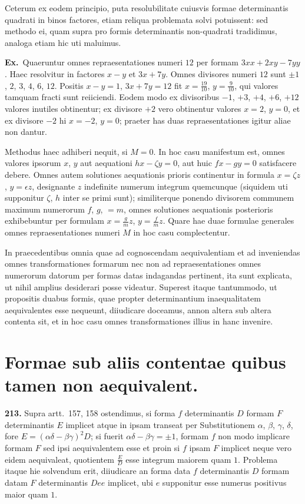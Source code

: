 \documentclass[12pt,a4paper]{article}
\theoremstyle{plain}
\theoremstyle{definition}
\theoremstyle{remark}
\begin{document}
Ceterum ex eodem principio, puta resolubilitate cuiusvis formae determinantis quadrati in binos factores, etiam reliqua problemata solvi potuissent: sed methodo ei, quam supra pro formis determinantis non-quadrati tradidimus, analoga etiam hic uti maluimus.

\textbf{Ex.}\ Quaeruntur omnes repraesentationes numeri $12$ per formam $3xx+2xy-7yy$. Haec resolvitur in factores $x-y$ et $3x+7y$. Omnes divisores numeri $12$ sunt $\pm 1$, $2$, $3$, $4$, $6$, $12$. Positis $x-y=1$, $3x+7y=12$ fit $x=\frac{19}{10}$, $y=\frac{9}{10}$, qui valores tamquam fracti sunt reiiciendi. Eodem modo ex divisoribus $-1$, $+3$, $+4$, $+6$, $+12$ valores inutiles obtinentur; ex divisore $+2$ vero obtinentur valores $x=2$, $y=0$, et ex divisore $-2$ hi $x=-2$, $y=0$; praeter has duas repraesentationes igitur aliae non dantur.

Methodus haec adhiberi nequit, si $M=0$. In hoc casu manifestum est, omnes valores ipsorum $x$, $y$ aut aequationi $hx-\zeta y=0$, aut huic $fx-gy=0$ satisfacere debere. Omnes autem solutiones aequationis prioris continentur in formula $x=\zeta z$, $y=\epsilon z$, designante $z$ indefinite numerum integrum quemcunque (siquidem uti supponitur $\zeta$, $h$ inter se primi sunt); similiterque ponendo divisorem communem maximum numerorum $f$, $g$, $=m$, omnes solutiones aequationis posterioris exhibebuntur per formulam $x=\frac{g}{m}z$, $y=\frac{f}{m}z$. Quare hae duae formulae generales omnes repraesentationes numeri $M$ in hoc casu complectentur.

In praecedentibus omnia quae ad cognoscendam aequivalentiam et ad inveniendas omnes transformationes formarum nec non ad repraesentationes omnes numerorum datorum per formas datas indagandas pertinent, ita sunt explicata, ut nihil amplius desiderari posse videatur. Superest itaque tantummodo, ut propositis duabus formis, quae propter determinantium inaequalitatem aequivalentes esse nequeunt, diiudicare doceamus, annon altera sub altera contenta sit, et in hoc casu omnes transformationes illius in hanc invenire.


\section*{Formae sub aliis contentae quibus tamen non aequivalent.}

\textbf{213.}
Supra artt.\ 157, 158 ostendimus, si forma $f$ determinantis $D$ formam $F$ determinantis $E$ implicet atque in ipsam transeat per Substitutionem $\alpha$, $\beta$, $\gamma$, $\delta$, fore $E=(\alpha\delta-\beta\gamma)^2D$; si fuerit $\alpha\delta-\beta\gamma=\pm 1$, formam $f$ non modo implicare formam $F$ sed ipsi aequivalentem esse et proin si $f$ ipsam $F$ implicet neque vero eidem aequivaleat, quotientem $\frac{E}{D}$ esse integrum maiorem quam $1$. Problema itaque hie solvendum erit, diiudicare an forma data $f$ determinantis $D$ formam datam $F$ determinantis $Dee$ implicet, ubi $e$ supponitur esse numerus positivus maior quam $1$.
\end{document}
